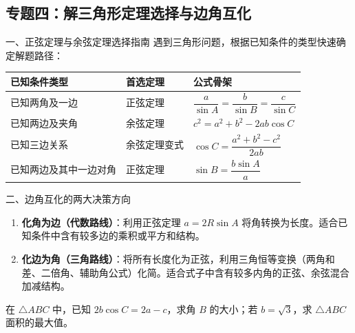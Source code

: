 \documentclass[11pt,a4paper]{ctexart}
\begin{document}
\newpage

\subsection{专题四：解三角形定理选择与边角互化}

\begin{theorembox}{一、正弦定理与余弦定理选择指南}
遇到三角形问题，根据已知条件的类型快速确定解题路径：
\begin{center}
\begin{tabularx}{\textwidth}{p{3.2cm}p{4.0cm}X}
\toprule[1.1pt]
\textbf{已知条件类型} & \textbf{首选定理} & \textbf{公式骨架} \\
\midrule
已知两角及一边 & 正弦定理 & \(\dfrac{a}{\sin A} = \dfrac{b}{\sin B} = \dfrac{c}{\sin C}\) \\ \hline
已知两边及夹角 & 余弦定理 & \(c^2 = a^2 + b^2 - 2ab\cos C\) \\ \hline
已知三边关系 & 余弦定理变式 & \(\cos C = \dfrac{a^2 + b^2 - c^2}{2ab}\) \\ \hline
已知两边及其中一边对角 & 正弦定理 & \(\sin B = \dfrac{b\sin A}{a}\) \\
\bottomrule[1.1pt]
\end{tabularx}
\end{center}
\end{theorembox}

\begin{theorembox}{二、边角互化的两大决策方向}
\begin{enumerate}
  \item \textbf{化角为边（代数路线）}：利用正弦定理 \(a = 2R\sin A\) 将角转换为长度。适合已知条件中含有较多边的乘积或平方和结构。
  \item \textbf{化边为角（三角路线）}：将所有长度化为正弦，利用三角恒等变换（两角和差、二倍角、辅助角公式）化简。适合式子中含有较多内角的正弦、余弦混合加减结构。
\end{enumerate}
\end{theorembox}

{\small 在 \(\triangle ABC\) 中，已知 \(2b\cos C = 2a - c\)，求角 \(B\) 的大小；若 \(b = \sqrt{3}\)，求 \(\triangle ABC\) 面积的最大值。}
\end{document}
